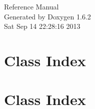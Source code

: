 \documentclass[a4paper]{book}
\begin{document}
\hypersetup{pageanchor=false}
\begin{titlepage}
\vspace*{7cm}
\begin{center}
{\Large Reference Manual}\\
\vspace*{1cm}
{\large Generated by Doxygen 1.6.2}\\
\vspace*{0.5cm}
{\small Sat Sep 14 22:28:16 2013}\\
\end{center}
\end{titlepage}
\clearemptydoublepage
{}
\tableofcontents
\clearemptydoublepage
{}
\hypersetup{pageanchor=true}
\chapter{Class Index}

\chapter{Class Index}

\end{document}
